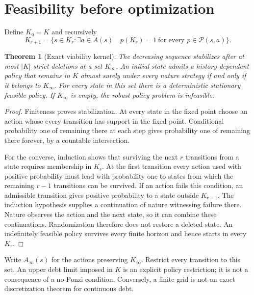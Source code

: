 \documentclass[11pt,a4paper]{article}
\newtheorem{theorem}{Theorem}[section]
\theoremstyle{definition}
\theoremstyle{remark}
\begin{document}
\section{Feasibility before optimization}
Define $K_0=K$ and recursively
\[
 K_{r+1}=\{s\in K_r:\exists a\in A(s)\quad
       p(K_r)=1\ \text{for every }p\in\mathcal P(s,a)\}.
\]
\begin{theorem}[Exact viability kernel]
The decreasing sequence stabilizes after at most $|K|$ strict deletions at a set $K_\infty$. An initial state admits a history-dependent policy that remains in $K$ almost surely under every nature strategy if and only if it belongs to $K_\infty$. For every state in this set there is a deterministic stationary feasible policy. If $K_\infty$ is empty, the robust policy problem is infeasible.
\end{theorem}
\begin{proof}
Finiteness proves stabilization. At every state in the fixed point choose an action whose every transition has support in the fixed point. Conditional probability one of remaining there at each step gives probability one of remaining there forever, by a countable intersection.

For the converse, induction shows that surviving the next $r$ transitions from a state requires membership in $K_r$. At the first transition every action used with positive probability must lead with probability one to states from which the remaining $r-1$ transitions can be survived. If an action fails this condition, an admissible transition gives positive probability to a state outside $K_{r-1}$. The induction hypothesis supplies a continuation of nature witnessing failure there. Nature observes the action and the next state, so it can combine these continuations. Randomization therefore does not restore a deleted state. An indefinitely feasible policy survives every finite horizon and hence starts in every $K_r$.
\end{proof}
Write $A_\infty(s)$ for the actions preserving $K_\infty$. Restrict every transition to this set. An upper debt limit imposed in $K$ is an explicit policy restriction; it is not a consequence of a no-Ponzi condition. Conversely, a finite grid is not an exact discretization theorem for continuous debt.
\end{document}
